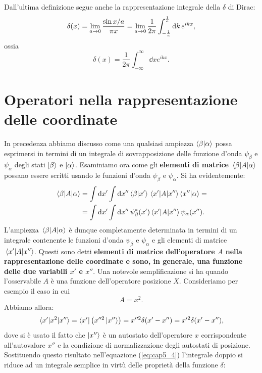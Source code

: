 \documentclass[a4paper,12pt,oneside]{book}
\begin{document}
Dall'ultima definizione segue anche la rappresentazione integrale della $\delta$ di Dirac:
\begin{equation}
  \delta\qty(x) = \lim_{a\to0}\frac{\sin{x/a}}{\pi x}=\lim_{a\to0}\frac{1}{2\pi}\int_{-\frac{1}{a}}^{\frac{1}{a}}\dd{k}e^{ikx} ,
\end{equation}
ossia
\begin{equation}
  \delta(x)=\frac{1}{2\pi}\int_{-\infty}^{\infty}\dd{x}e^{ikx} .
\end{equation}
\section{Operatori nella rappresentazione delle coordinate}
In precedenza abbiamo discusso come una qualsiasi ampiezza $\braket{\beta}{\alpha}$ possa esprimersi in termini di un integrale di sovrapposizione delle funzione d'onda $\psi_{\beta}$ e $\psi_{\alpha}$ degli stati $\ket{\beta}$ e $\ket{\alpha}$.
Esaminiamo ora come gli \textbf{elementi di matrice} $\mel{\beta}{A}{\alpha}$ possano essere scritti usando le funzioni d'onda $\psi_{\beta}$ e $\psi_{\alpha}$. Si ha evidentemente:
\begin{align}
  \label{eq:cap5_4}
  \mel{\beta}{A}{\alpha} &= \int\dd{x'}\int\dd{x''}\braket{\beta}{x'}\mel{x'}{A}{x''}\braket{x''}{\alpha} =\nonumber\\
  &= \int\dd{x'}\int\dd{x''} \psi_{\beta}^*\qty(x')\mel{x'}{A}{x''}\psi_{\alpha}\qty(x'') .
\end{align}
L'ampiezza $\mel{\beta}{A}{\alpha}$ è dunque completamente determinata in termini di un integrale contenente le funzioni d'onda $\psi_{\beta}$ e $\psi_{\alpha}$ e gli elementi di matrice $\mel{x'}{A}{x''}$. Questi sono detti \textbf{elementi di matrice dell'operatore $A$ nella rappresentazione delle coordinate e sono, in generale, una funzione delle due variabili $x'$ e $x''$}.
Una notevole semplificazione si ha quando l'osservabile $A$ è una funzione dell'operatore posizione $X$. Consideriamo per esempio il caso in cui
\begin{equation}
  A= x^2 .
\end{equation}
Abbiamo allora:
\begin{equation}
  \mel{x'}{x^2}{x''} = \bra{x'}\qty(x''^2\ket{x''}) = x''^2\delta\qty(x'-x'') = x'^2\delta\qty(x'-x'') ,
\end{equation}
dove si è usato il fatto che $\ket{x''}$ è un autostato dell'operatore $x$ corrispondente all'autovalore $x''$ e la condizione di normalizzazione degli autostati di posizione. Sostituendo questo risultato nell'equazione (\ref{eq:cap5_4}) l'integrale doppio si riduce ad un integrale semplice in virtù delle proprietà della funzione $\delta$:
\end{document}
